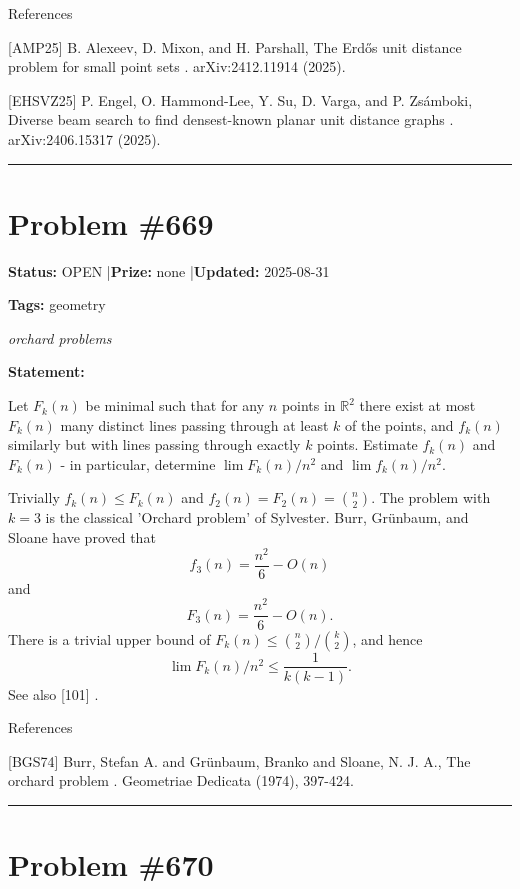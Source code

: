 \documentclass{article}
\begin{document}
References

[AMP25] B. Alexeev, D. Mixon, and H. Parshall, The Erd\H{o}s unit distance problem for small point sets . arXiv:2412.11914 (2025).

[EHSVZ25] P. Engel, O. Hammond-Lee, Y. Su, D. Varga, and P. Zs\'{a}mboki, Diverse beam search to find densest-known planar unit distance graphs . arXiv:2406.15317 (2025).

\noindent\rule{\linewidth}{0.4pt}


\section{Problem \#669}
\label{prob:669}

\noindent\textbf{Status:} OPEN \quad|\quad \textbf{Prize:} none \quad|\quad \textbf{Updated:} 2025-08-31

\noindent\textbf{Tags:} geometry

\medskip
\noindent\textit{orchard problems}


\noindent\textbf{Statement:}

Let $F_k(n)$ be minimal such that for any $n$ points in $\mathbb{R}^2$ there exist at most $F_k(n)$ many distinct lines passing through at least $k$ of the points, and $f_k(n)$ similarly but with lines passing through exactly $k$ points. Estimate $f_k(n)$ and $F_k(n)$ - in particular, determine $\lim F_k(n)/n^2$ and $\lim f_k(n)/n^2$.




Trivially $f_k(n)\leq F_k(n)$ and $f_2(n)=F_2(n)=\binom{n}{2}$. The problem with $k=3$ is the classical 'Orchard problem' of Sylvester. Burr, Gr\"{u}nbaum, and Sloane \cite{BGS74} have proved that\[f_3(n)=\frac{n^2}{6}-O(n)\]and\[F_3(n)=\frac{n^2}{6}-O(n).\]There is a trivial upper bound of $F_k(n) \leq \binom{n}{2}/\binom{k}{2}$, and hence\[\lim F_k(n)/n^2 \leq \frac{1}{k(k-1)}.\]See also [101] .




References

[BGS74] Burr, Stefan A. and Gr\"{u}nbaum, Branko and Sloane, N. J. A., The orchard problem . Geometriae Dedicata (1974), 397-424.

\noindent\rule{\linewidth}{0.4pt}


\section{Problem \#670}
\label{prob:670}
\end{document}
